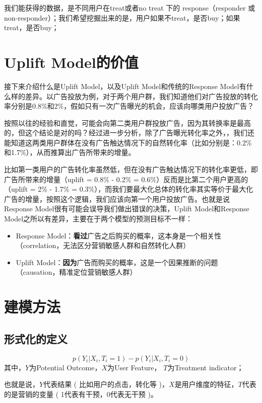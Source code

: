 \documentclass[12pt]{article}
\begin{document}
我们能获得的数据，是不同用户在treat或者no treat 下的 response（responder 或 non-responder）；我们希望挖掘出来的是，用户如果不treat，是否buy；如果 treat，是否buy；

\section{Uplift Model的价值}
接下来介绍什么是Uplift Model，以及Uplift Model和传统的Response Model有什么样的差异。以广告投放为例，对于两个用户群，我们知道他们对广告投放的转化率分别是0.8\%和2\%，假如只有一次广告曝光的机会，应该向哪类用户投放广告？

按照以往的经验和直觉，可能会向第二类用户群投放广告，因为其转换率是最高的，但这个结论是对的吗？经过进一步分析，除了广告曝光转化率之外，，我们还能知道这两类用户群体在没有广告触达情况下的自然转化率（比如分别是：0.2\%和1.7\%），从而推算出广告所带来的增量。

比如第一类用户的广告转化率虽然低，但在没有广告触达情况下的转化率更低，即广告所带来的增量（uplift = 0.8\% - 0.2\% = 0.6\%）反而是比第二个用户更高的（uplift = 2\% - 1.7\% = 0.3\%），而我们要最大化总体的转化率其实等价于最大化广告的增量，按照这个逻辑，我们应该向第一个用户投放广告。也就是说Response Model很有可能会误导我们做出错误的决策，Uplift Model和Response Model之所以有差异，主要在于两个模型的预测目标不一样：
\begin{itemize}
\setlength{\itemsep}{0pt}
\setlength{\parsep}{0pt}
\setlength{\parskip}{0pt}
    \item Response Model：\textbf{看过}广告之后购买的概率，这本身是一个相关性（correlation，无法区分营销敏感人群和自然转化人群）
    \item Uplift Model：\textbf{因为}广告而购买的概率，这是一个因果推断的问题（causation，精准定位营销敏感人群）
\end{itemize}

\section{建模方法}
\subsection{形式化的定义}
$$
p(Y_i|X_i, T_i = 1) - p(Y_i|X_i, T_i = 0) 
$$
其中，$Y$为Potential Outcome，$X$为User Feature， $T$为Treatment indicator；

也就是说，$Y$代表结果 ( 比如用户的点击，转化等 )，$X$是用户维度的特征，$T$代表的是营销的变量 ( 1代表有干预，0代表无干预 )。
\end{document}
